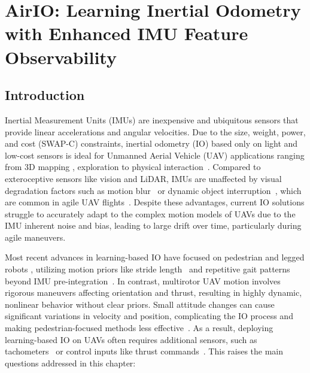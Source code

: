 \chapter{AirIO: Learning Inertial Odometry with Enhanced IMU Feature Observability} \label{chapter:airio}



\section{Introduction}
\label{sec:airio:intro}

Inertial Measurement Units (IMUs) are inexpensive and ubiquitous sensors that provide linear accelerations and angular velocities.
Due to the size, weight, power, and cost (SWAP-C) constraints, inertial odometry (IO) based only on light and low-cost sensors is ideal for Unmanned Aerial Vehicle (UAV) applications ranging from 3D mapping \cite{zhao2021super}, exploration \cite{hu2023off} to physical interaction~\cite{guo2024flying}.
Compared to exteroceptive sensors like vision and LiDAR, IMUs are unaffected by visual degradation factors such as motion blur~\cite{Zhao_2024_CVPR} or dynamic object interruption~\cite{qiu2022airdos}, which are common in agile UAV flights~\cite{CioffiRal2023}.
Despite these advantages, current IO solutions struggle to accurately adapt to the complex motion models of UAVs due to the IMU inherent noise and bias, leading to large drift over time, particularly during agile maneuvers.

Most recent advances in learning-based IO have focused on pedestrian and legged robots \cite{liu2020tlio, herath2020ronin, buchanan2022deep}, utilizing motion priors like stride length~\cite{yan2018ridi} and repetitive gait patterns~\cite{yang2023multi, teng2020arpdr} beyond IMU pre-integration~\cite{forster2015imu}.
In contrast, multirotor UAV motion involves rigorous maneuvers affecting orientation and thrust, resulting in highly dynamic, nonlinear behavior without clear priors.
Small attitude changes can cause significant variations in velocity and position, complicating the IO process and making pedestrian-focused methods less effective~\cite{CioffiRal2023}.
As a result, deploying learning-based IO on UAVs often requires additional sensors, such as tachometers~\cite{zhang2022dido} or control inputs like thrust commands~\cite{CioffiRal2023}.
This raises the main questions addressed in this chapter:

